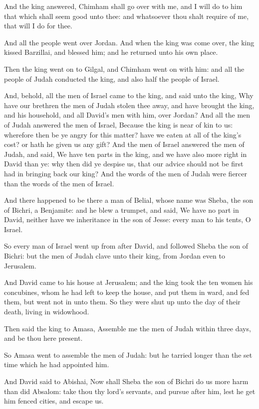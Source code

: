 \Verse And the king answered, Chimham shall go over with me, and I will do to him that which shall seem good unto thee: and whatsoever thou shalt require of me, that will I do for thee.

\Verse And all the people went over Jordan. And when the king was come over, the king kissed Barzillai, and blessed him; and he returned unto his own place.

\Verse Then the king went on to Gilgal, and Chimham went on with him: and all the people of Judah conducted the king, and also half the people of Israel.

\Verse And, behold, all the men of Israel came to the king, and said unto the king, Why have our brethren the men of Judah stolen thee away, and have brought the king, and his household, and all David's men with him, over Jordan?  \Verse And all the men of Judah answered the men of Israel, Because the king is near of kin to us: wherefore then be ye angry for this matter? have we eaten at all of the king's cost? or hath he given us any gift?  \Verse And the men of Israel answered the men of Judah, and said, We have ten parts in the king, and we have also more right in David than ye: why then did ye despise us, that our advice should not be first had in bringing back our king?  And the words of the men of Judah were fiercer than the words of the men of Israel.


\Chapter
\Verse And there happened to be there a man of Belial, whose name was Sheba, the son of Bichri, a Benjamite: and he blew a trumpet, and said, We have no part in David, neither have we inheritance in the son of Jesse: every man to his tents, O Israel.

\Verse So every man of Israel went up from after David, and followed Sheba the son of Bichri: but the men of Judah clave unto their king, from Jordan even to Jerusalem.

\Verse And David came to his house at Jerusalem; and the king took the ten women his concubines, whom he had left to keep the house, and put them in ward, and fed them, but went not in unto them. So they were shut up unto the day of their death, living in widowhood.

\Verse Then said the king to Amasa, Assemble me the men of Judah within three days, and be thou here present.

\Verse So Amasa went to assemble the men of Judah: but he tarried longer than the set time which he had appointed him.

\Verse And David said to Abishai, Now shall Sheba the son of Bichri do us more harm than did Absalom: take thou thy lord's servants, and pursue after him, lest he get him fenced cities, and escape us.

